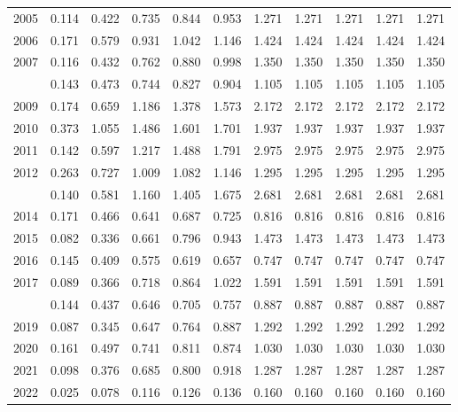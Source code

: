 \documentclass[
]{article}
\begin{document}
\begin{longtable}[t]{lrrrrrrrrrr}
2005 & 0.114 & 0.422 & 0.735 & 0.844 & 0.953 & 1.271 & 1.271 & 1.271 & 1.271 & 1.271\\
2006 & 0.171 & 0.579 & 0.931 & 1.042 & 1.146 & 1.424 & 1.424 & 1.424 & 1.424 & 1.424\\
2007 & 0.116 & 0.432 & 0.762 & 0.880 & 0.998 & 1.350 & 1.350 & 1.350 & 1.350 & 1.350\\
\addlinespace
2008 & 0.143 & 0.473 & 0.744 & 0.827 & 0.904 & 1.105 & 1.105 & 1.105 & 1.105 & 1.105\\
2009 & 0.174 & 0.659 & 1.186 & 1.378 & 1.573 & 2.172 & 2.172 & 2.172 & 2.172 & 2.172\\
2010 & 0.373 & 1.055 & 1.486 & 1.601 & 1.701 & 1.937 & 1.937 & 1.937 & 1.937 & 1.937\\
2011 & 0.142 & 0.597 & 1.217 & 1.488 & 1.791 & 2.975 & 2.975 & 2.975 & 2.975 & 2.975\\
2012 & 0.263 & 0.727 & 1.009 & 1.082 & 1.146 & 1.295 & 1.295 & 1.295 & 1.295 & 1.295\\
\addlinespace
2013 & 0.140 & 0.581 & 1.160 & 1.405 & 1.675 & 2.681 & 2.681 & 2.681 & 2.681 & 2.681\\
2014 & 0.171 & 0.466 & 0.641 & 0.687 & 0.725 & 0.816 & 0.816 & 0.816 & 0.816 & 0.816\\
2015 & 0.082 & 0.336 & 0.661 & 0.796 & 0.943 & 1.473 & 1.473 & 1.473 & 1.473 & 1.473\\
2016 & 0.145 & 0.409 & 0.575 & 0.619 & 0.657 & 0.747 & 0.747 & 0.747 & 0.747 & 0.747\\
2017 & 0.089 & 0.366 & 0.718 & 0.864 & 1.022 & 1.591 & 1.591 & 1.591 & 1.591 & 1.591\\
\addlinespace
2018 & 0.144 & 0.437 & 0.646 & 0.705 & 0.757 & 0.887 & 0.887 & 0.887 & 0.887 & 0.887\\
2019 & 0.087 & 0.345 & 0.647 & 0.764 & 0.887 & 1.292 & 1.292 & 1.292 & 1.292 & 1.292\\
2020 & 0.161 & 0.497 & 0.741 & 0.811 & 0.874 & 1.030 & 1.030 & 1.030 & 1.030 & 1.030\\
2021 & 0.098 & 0.376 & 0.685 & 0.800 & 0.918 & 1.287 & 1.287 & 1.287 & 1.287 & 1.287\\
2022 & 0.025 & 0.078 & 0.116 & 0.126 & 0.136 & 0.160 & 0.160 & 0.160 & 0.160 & 0.160\\*
\end{longtable}
\end{document}
